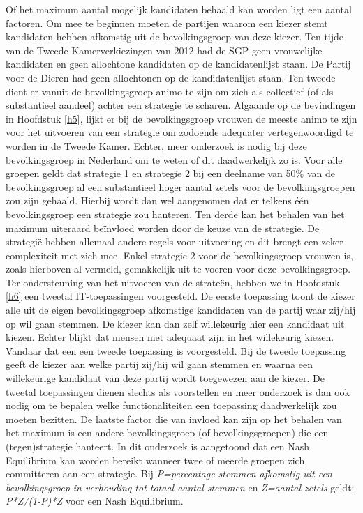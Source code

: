 Of het maximum aantal mogelijk kandidaten behaald kan worden ligt een aantal factoren. Om mee te beginnen moeten de partijen waarom een kiezer stemt kandidaten hebben afkomstig uit de bevolkingsgroep van deze kiezer. Ten tijde van de Tweede Kamerverkiezingen van 2012 had de SGP geen vrouwelijke kandidaten en geen allochtone kandidaten op de kandidatenlijst staan. De Partij voor de Dieren had geen allochtonen op de kandidatenlijst staan. Ten tweede dient er vanuit de bevolkingsgroep animo te zijn om zich als collectief (of als substantieel aandeel) achter een strategie te scharen. Afgaande op de bevindingen in Hoofdstuk \ref{h5}, lijkt er bij de bevolkingsgroep vrouwen de meeste animo te zijn voor het uitvoeren van een strategie om zodoende adequater vertegenwoordigd te worden in de Tweede Kamer. Echter, meer onderzoek is nodig bij deze bevolkingsgroep in Nederland om te weten of dit daadwerkelijk zo is. Voor alle groepen geldt dat strategie 1 en strategie 2 bij een deelname van 50\% van de bevolkingsgroep al een substantieel hoger aantal zetels voor de bevolkingsgroepen zou zijn gehaald. Hierbij wordt dan wel aangenomen dat er telkens één bevolkingsgroep een strategie zou hanteren. Ten derde kan het behalen van het maximum uiteraard be\"{i}nvloed worden door de keuze van de strategie. De strategi\"{e} hebben allemaal andere regels voor uitvoering en dit brengt een zeker complexiteit met zich mee. Enkel strategie 2 voor de bevolkingsgroep vrouwen is, zoals hierboven al vermeld, gemakkelijk uit te voeren voor deze bevolkingsgroep.  Ter ondersteuning van het uitvoeren van de strate\"{e}n, hebben we in Hoofdstuk \ref{h6} een tweetal IT-toepassingen voorgesteld. De eerste toepassing toont de kiezer alle uit de eigen bevolkingsgroep afkomstige kandidaten van de partij waar zij/hij op wil gaan stemmen. De kiezer kan dan zelf willekeurig hier een kandidaat uit kiezen. Echter blijkt dat mensen niet adequaat zijn in het willekeurig kiezen. Vandaar dat een een tweede toepassing is voorgesteld. Bij de tweede toepassing geeft de kiezer aan welke partij zij/hij wil gaan stemmen en waarna een willekeurige kandidaat van deze partij wordt toegewezen aan de kiezer.  De tweetal toepassingen dienen slechts als voorstellen en meer onderzoek is dan ook nodig om te bepalen welke functionaliteiten een toepassing daadwerkelijk zou moeten bezitten. De laatste factor die van invloed kan zijn op het behalen van het maximum is een andere bevolkingsgroep (of bevolkingsgroepen) die een (tegen)strategie hanteert. In dit onderzoek is aangetoond dat een Nash Equilibrium kan worden bereikt wanneer twee of meerde groepen zich committeren aan een strategie. Bij \textit{P=percentage stemmen afkomstig uit een bevolkingsgroep in verhouding tot totaal aantal stemmen} en \textit{Z=aantal zetels} geldt: \textit{P*Z/(1-P)*Z} voor een Nash Equilibrium.


